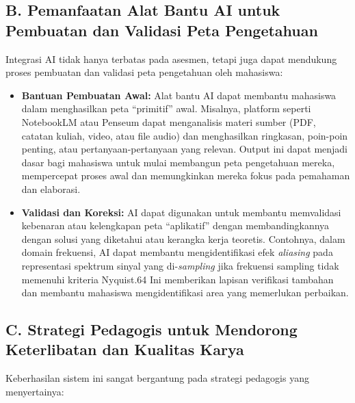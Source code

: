 \documentclass[
  letterpaper,
  DIV=11,
  numbers=noendperiod]{scrreprt}
\begin{document}
\subsection{B. Pemanfaatan Alat Bantu AI untuk Pembuatan dan Validasi
Peta
Pengetahuan}\label{b.-pemanfaatan-alat-bantu-ai-untuk-pembuatan-dan-validasi-peta-pengetahuan}

Integrasi AI tidak hanya terbatas pada asesmen, tetapi juga dapat
mendukung proses pembuatan dan validasi peta pengetahuan oleh mahasiswa:

\begin{itemize}
\item
  \textbf{Bantuan Pembuatan Awal:} Alat bantu AI dapat membantu
  mahasiswa dalam menghasilkan peta ``primitif'' awal. Misalnya,
  platform seperti NotebookLM atau Penseum dapat menganalisis materi
  sumber (PDF, catatan kuliah, video, atau file audio) dan menghasilkan
  ringkasan, poin-poin penting, atau pertanyaan-pertanyaan yang relevan.
  Output ini dapat menjadi dasar bagi mahasiswa untuk mulai membangun
  peta pengetahuan mereka, mempercepat proses awal dan memungkinkan
  mereka fokus pada pemahaman dan elaborasi.
\item
  \textbf{Validasi dan Koreksi:} AI dapat digunakan untuk membantu
  memvalidasi kebenaran atau kelengkapan peta ``aplikatif'' dengan
  membandingkannya dengan solusi yang diketahui atau kerangka kerja
  teoretis. Contohnya, dalam domain frekuensi, AI dapat membantu
  mengidentifikasi efek \emph{aliasing} pada representasi spektrum
  sinyal yang di-\emph{sampling} jika frekuensi sampling tidak memenuhi
  kriteria Nyquist.64 Ini memberikan lapisan verifikasi tambahan dan
  membantu mahasiswa mengidentifikasi area yang memerlukan perbaikan.
\end{itemize}

\subsection{C. Strategi Pedagogis untuk Mendorong Keterlibatan dan
Kualitas
Karya}\label{c.-strategi-pedagogis-untuk-mendorong-keterlibatan-dan-kualitas-karya}

Keberhasilan sistem ini sangat bergantung pada strategi pedagogis yang
menyertainya:
\end{document}
